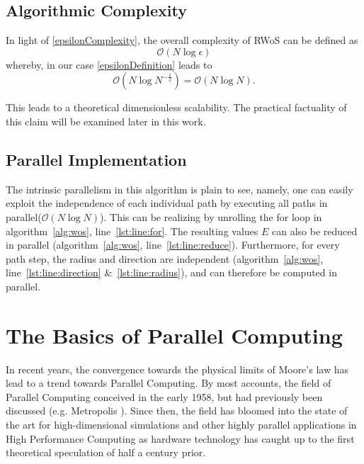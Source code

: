 \subsection{Algorithmic Complexity}
In light of \ref{epsilonComplexity}, the overall complexity of \Gls{RWoS} can be
defined as $$\mathcal{O}(N \log{}\epsilon)$$ whereby, in our case \ref{epsilonDefinition}
 leads to $$\mathcal{O}(N \log{N^{-\frac{1}{2}}}) = \mathcal{O}(N \log{N}).$$

 This leads to a theoretical dimensionless scalability\cite{Bornemann}.  The practical factuality
 of this claim will be examined later in this work.

\subsection{Parallel Implementation}

The intrinsic parallelism in this algorithm is plain to see, namely, one can easily
exploit the independence of each individual path by executing all paths in parallel($\mathcal{O}(N \log{}N)$).
This can be realizing by unrolling the for loop in algorithm~\ref{alg:wos}, line~\ref{lst:line:for}.
The resulting values $E$ can also be reduced in parallel (algorithm~\ref{alg:wos}, line~\ref{lst:line:reduce}).  Furthermore, for every path step,
the radius and direction are independent (algorithm~\ref{alg:wos}, line~\ref{lst:line:direction} \&~\ref{lst:line:radius}),
 and can therefore be computed in parallel. \cite{Muller,DeLaurentis,Bornemann}
\section{The Basics of Parallel Computing}
In recent years, the convergence towards the physical limits of Moore's law has lead to a
trend towards Parallel Computing\cite{Kumar}\cite{Markov}.  By most accounts, the
field of Parallel Computing conceived in the early 1958\cite{Gill}, but had previously
been discussed (e.g. Metropolis \cite{Metropolis}). Since then, the field has
 bloomed into the state of the art for high-dimensional simulations and
 other highly parallel applications in
High Performance Computing as hardware technology has caught up to the first
theoretical speculation of half a century prior. \par

